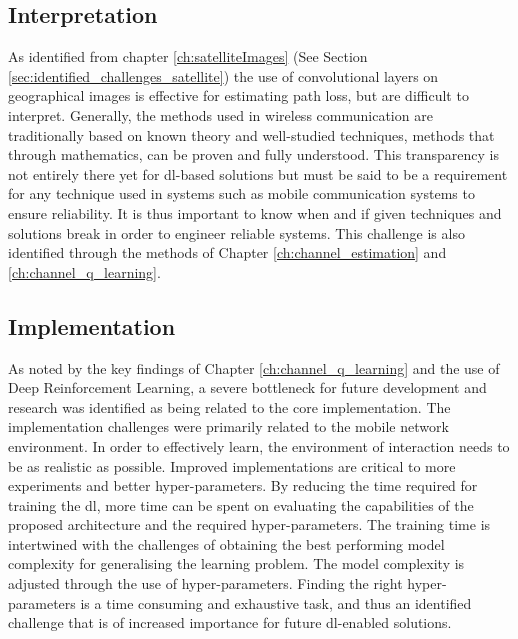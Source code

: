 \subsection{Interpretation}
As identified from chapter \ref{ch:satelliteImages} (See Section \ref{sec:identified_challenges_satellite}) the use of convolutional layers on geographical images is effective for estimating path loss, but are difficult to interpret. Generally, the methods used in wireless communication are traditionally based on known theory and well-studied techniques, methods that through mathematics, can be proven and fully understood. This transparency is not entirely there yet for \gls{dl}-based solutions \cite{Samek2017ExplainableModels} but must be said to be a  requirement for any technique used in systems such as mobile communication systems to ensure reliability. It is thus important to know when and if given techniques and solutions break in order to engineer reliable systems. This challenge is also identified through the methods of Chapter \ref{ch:channel_estimation} and \ref{ch:channel_q_learning}. 

\subsection{Implementation}
As noted by the key findings of Chapter \ref{ch:channel_q_learning} and the use of Deep Reinforcement Learning, a severe bottleneck for future development and research was identified as being related to the core implementation. The implementation challenges were primarily related to the mobile network environment. In order to effectively learn, the environment of interaction needs to be as realistic as possible. Improved implementations are critical to more experiments and better hyper-parameters. By reducing the time required for training the \gls{dl}, more time can be spent on evaluating the capabilities of the proposed architecture and the required hyper-parameters. The training time is intertwined with the challenges of obtaining the best performing model complexity for generalising the learning problem. The model complexity is adjusted through the use of hyper-parameters. Finding the right hyper-parameters is a time consuming and exhaustive task, and thus an identified challenge that is of increased importance for future \gls{dl}-enabled solutions.

